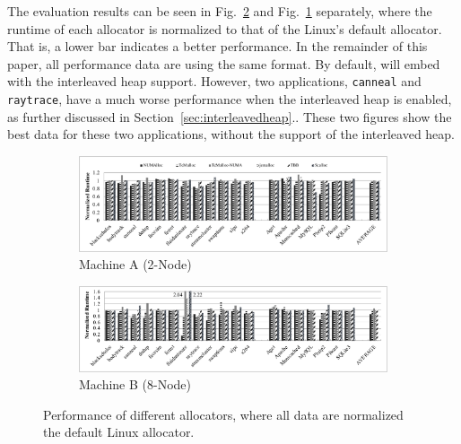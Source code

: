  The evaluation results can be seen in Fig.~\ref{8node-parsec-perf} and Fig.~\ref{2node-parsec-perf} separately, where the runtime of each allocator is normalized to that of the Linux's default  allocator. That is, a lower bar indicates a better performance. In the remainder of this paper, all performance data are using the same format. By default, \NM{} will embed with the interleaved heap support. However, two applications, \texttt{canneal} and \texttt{raytrace}, have a much worse performance when the interleaved heap is enabled,  as further discussed in Section~\ref{sec:interleavedheap}.. 
 These two figures show the best data for these two applications, without the support of the interleaved heap.    


\begin{figure}[!ht]
    \centering
    \begin{subfigure}{0.9\textwidth}
    \includegraphics[width=\textwidth]{figure/2-node-parsec-perf.pdf}
    \caption{Machine A (2-Node)\label{2node-parsec-perf}}
    \end{subfigure}
    
	\vspace{0.1in}  
	
	\begin{subfigure}{0.9\textwidth}    \includegraphics[width=\textwidth]{figure/8-node-parsec-perf.pdf}
    \caption{Machine B (8-Node)\label{8node-parsec-perf}}
    \end{subfigure}
    \caption{Performance of different allocators, where all data are normalized the default Linux allocator. \label{sec:perf}}
 \end{figure}



